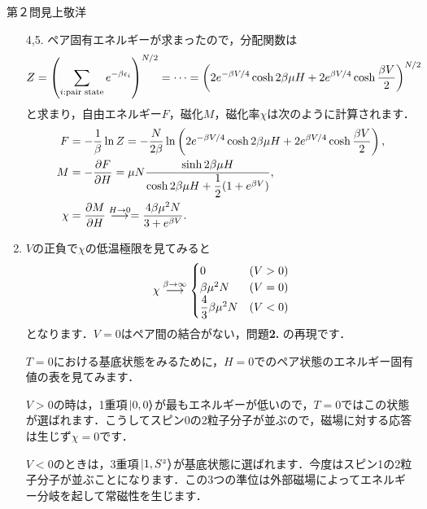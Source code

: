 \begin{answer}{第２問}{見上敬洋}
\begin{enumerate}
\item[4,5.]
  ペア固有エネルギーが求まったので，分配関数は
  \begin{equation}
  Z = \left( \sum_{i:\text{pair state}} e^{-\beta \epsilon_i} \right)^{N/2}
  =\cdots =  \left( 2e^{-\beta V/4} \cosh 2\beta\mu H + 2e^{\beta V/4} \cosh \frac{\beta V}{2} \right)^{N/2}\notag
  \end{equation}
  と求まり，自由エネルギー$F$，磁化$M$，磁化率$\chi$は次のように計算されます．
  \begin{align}
  F &= -\frac 1\beta \ln Z = -\frac {N}{2\beta}\ln\left( 2e^{-\beta V/4} \cosh 2\beta\mu H + 2e^{\beta V/4} \cosh \frac{\beta V}{2}\right), \notag\\
  M &= -\frac{\partial {F}}{\partial {H}} = \mu N \frac{\sinh 2\beta \mu H}{ \cosh 2\beta \mu H + \dfrac 12 (1+e^{\beta V}) }, \notag \\
  \chi &=\frac{\partial {M}}{\partial {H}}  \stackrel{H\to 0}{\longrightarrow} = \frac{4\beta\mu^2N}{3+e^{\beta V}}. \notag
  \end{align}

\setcounter{enumi}{5}
\item
  $V$の正負で$\chi$の低温極限を見てみると
  \begin{equation}
    \chi \stackrel{\beta \to \infty}{\longrightarrow}
    \begin{cases}
      0 & (V>0) \\
      \beta \mu^2 N & (V=0) \\
      \dfrac 43 \beta \mu^2 N & (V<0) \\
    \end{cases} \notag
  \end{equation}
  となります．$V=0$はペア間の結合がない，問題{\bf 2. }の再現です．

  $T=0$における基底状態をみるために，$H=0$でのペア状態のエネルギー固有値の表を見てみます．

  $V>0$の時は，1重項$\left. \left| {0,0} \right\rangle \!\! \right\rangle$が最もエネルギーが低いので，$T=0$ではこの状態が選ばれます．こうしてスピン0の2粒子分子が並ぶので，磁場に対する応答は生じず$\chi = 0$です．

  $V<0$のときは，3重項$\left. \left| {1,S^z} \right\rangle \!\! \right\rangle$が基底状態に選ばれます．今度はスピン1の2粒子分子が並ぶことになります．この3つの準位は外部磁場によってエネルギー分岐を起して常磁性を生じます．

  \medskip


\end{enumerate}
\end{answer}
